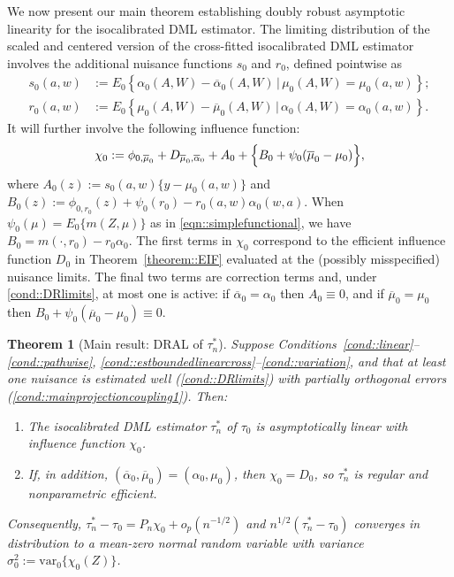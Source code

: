 \documentclass[11pt]{article}
\theoremstyle{plain}
\newtheorem{theorem}{Theorem}
\begin{document}
 
We now present our main theorem establishing doubly robust asymptotic linearity
for the isocalibrated DML estimator.  The limiting distribution of the scaled and centered version of the cross-fitted  isocalibrated DML estimator involves the additional nuisance functions $s_0$ and $r_0$, defined pointwise as
\begin{align*}
    s_0(a,w) &:= E_0\left\{ \alpha_0(A,W) - \overline{\alpha}_0(A,W)\,|\,\mu_0(A,W) = \mu_0(a,w)\right\};\\
    r_0(a,w) &:= E_0\left\{\mu_0(A,W) - \overline{\mu}_0(A,W)\,|\,  \alpha_0(A,W) = \alpha_0(a,w)\right\}.
\end{align*}
It will further involve the following influence function:
\[
\chi_0
:= \phi_{0,\overline{\mu}_0}
+ D_{\overline{\mu}_0,\overline{\alpha}_0}
+ A_0
+ \Bigl\{B_0 + \psi_0(\overline{\mu}_0-\mu_0)\Bigr\},
\]
where \(A_0(z) := s_0(a,w)\{y-\mu_0(a,w)\}\) and
\(B_0(z) := \phi_{0,r_0}(z) + \psi_0(r_0) - r_0(a,w)\alpha_0(w,a)\). When
\(\psi_0(\mu)=E_0\{m(Z,\mu)\}\) as in \eqref{eqn::simplefunctional}, we have
\(B_0 = m(\cdot,r_0) - r_0\alpha_0\). {\color{purple}
The first terms in \(\chi_0\) correspond to the efficient influence function $D_0$ in
Theorem~\ref{theorem::EIF} evaluated at the (possibly misspecified) nuisance
limits. The final two terms are correction terms and, under
\ref{cond::DRlimits}, at most one is active: if \(\overline{\alpha}_0=\alpha_0\)
then \(A_0\equiv 0\), and if \(\overline{\mu}_0=\mu_0\) then
\(B_0+\psi_0(\overline{\mu}_0-\mu_0)\equiv 0\).
}


 
\begin{theorem}[Main result: DRAL of \(\tau_n^*\)]
\label{theorem::DRinference}
Suppose Conditions~\ref{cond::linear}--\ref{cond::pathwise},
\ref{cond::estboundedlinearcross}--\ref{cond::variation}, and that at least
one nuisance is estimated well (\ref{cond::DRlimits}) with partially orthogonal
errors (\ref{cond::mainprojectioncoupling1}). Then:
\begin{enumerate}[label=\roman*)]
\item The isocalibrated DML estimator \(\tau_n^*\) of \(\tau_0\) is
asymptotically linear with influence function \(\chi_0\).
\item If, in addition, \((\overline{\alpha}_0,\overline{\mu}_0)=(\alpha_0,\mu_0)\),
then \(\chi_0 = D_0\), so \(\tau_n^*\) is regular and nonparametric efficient.
\end{enumerate}
Consequently, \(\tau_n^*-\tau_0 = P_n\chi_0 + o_p(n^{-1/2})\) and \(n^{1/2}(\tau_n^*-\tau_0)\) converges in distribution to a
mean-zero normal random variable with variance
\(\sigma_0^2 := \mathrm{var}_0\{\chi_0(Z)\}\).
\end{theorem}
\end{document}
